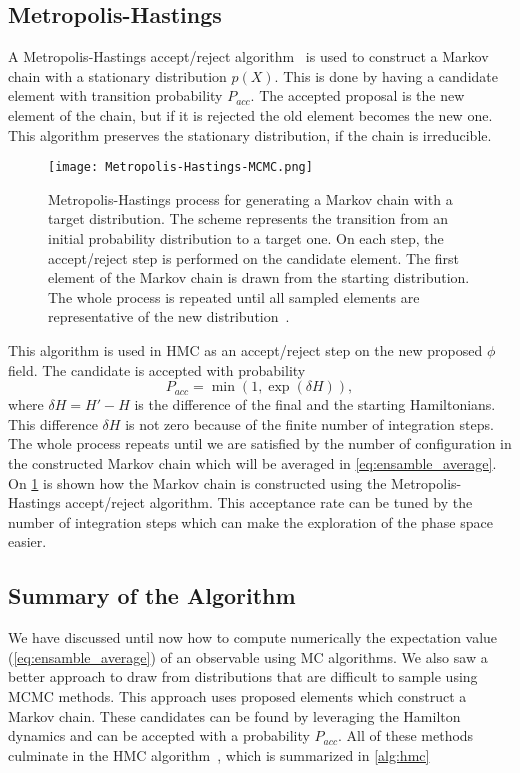 \subsection{Metropolis-Hastings}

A Metropolis-Hastings accept/reject algorithm~\cite{mhog, mhexpl} is used to construct a Markov chain with a stationary distribution $p(X)$. This is done by having a candidate element with transition probability $P_{acc}$. The accepted proposal is the new element of the chain, but if it is rejected the old element becomes the new one. This algorithm preserves the stationary distribution, if the chain is irreducible.

\begin{figure}[htbp]
    \centerline{\texttt{[image: 
        Metropolis-Hastings-MCMC.png]}}
    \caption{Metropolis-Hastings process for generating a Markov chain with a target distribution. The scheme represents the transition from an initial probability distribution to a target one. On each step, the accept/reject step is performed on the candidate element. The first element of the Markov chain is drawn from the starting distribution. The whole process is repeated until all sampled elements are representative of the new distribution~\cite{pic-metro}.
    }
    \label{fig:mn-mcmc}
\end{figure}
This algorithm is used in HMC as an accept/reject step on the new proposed $\phi$ field. The candidate is accepted with probability 
\begin{equation}
    P_{acc} = \min(1, \exp(\delta H)),
\end{equation}
where $\delta H = H' - H$ is the difference of the final and the starting Hamiltonians. This difference $\delta H$ is not zero because of the finite number of integration steps. The whole process repeats until we are satisfied by the number of configuration in the constructed Markov chain which will be averaged in \cref{eq:ensamble_average}. On \cref{fig:mn-mcmc} is shown how the Markov chain is constructed using the Metropolis-Hastings accept/reject algorithm. This acceptance rate can be tuned by the number of integration steps which can make the exploration of the phase space easier.

\subsection{Summary of the Algorithm}

We have discussed until now how to compute numerically the expectation value (\cref{eq:ensamble_average}) of an observable using MC algorithms. We also saw a better approach to draw from distributions that are difficult to sample using MCMC methods. This approach uses proposed elements which construct a Markov chain. These candidates can be found by leveraging the Hamilton dynamics and can be accepted with a probability $P_{acc}$. All of these methods culminate in the HMC algorithm~\cite{hmc}, which is summarized in \cref{alg:hmc}

